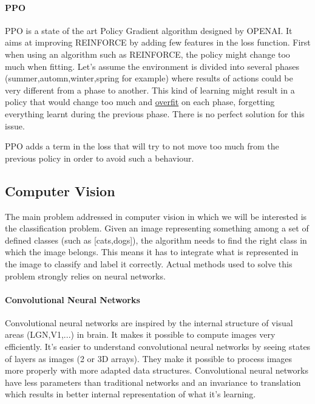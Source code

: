 \documentclass[11pt]{article}
\begin{document}
\paragraph{PPO}
PPO is a state of the art Policy Gradient algorithm designed by OPENAI. It aims at improving REINFORCE by adding few features in the loss function. First when using an algorithm such as REINFORCE, the policy might change too much when fitting. Let's assume the environment is divided into several phases (summer,automn,winter,spring for example) where results of actions could be very different from a phase to another. This kind of learning might result in a policy that would change too much and \underline{overfit} on each phase, forgetting everything learnt during the previous phase. There is no perfect solution for this issue.

PPO adds a term in the loss that will try to not move too much from the previous policy in order to avoid such a behaviour.
\subsection{Computer Vision}
The main problem addressed in computer vision in which we will be interested is the classification problem. Given an image representing something among a set of defined classes (such as [cats,dogs]), the algorithm needs to find the right class in which the image belongs. This means it has to integrate what is represented in the image to classify and label it correctly. Actual methods used to solve this problem strongly relies on neural networks.

\paragraph{Convolutional Neural Networks}
Convolutional neural networks are inspired by the internal structure of visual areas (LGN,V1,...) in brain. It makes it possible to compute images very efficiently. It's easier to understand convolutional neural networks by seeing states of layers as images (2 or 3D arrays). They make it possible to process images more properly with more adapted data structures. Convolutional neural networks have less parameters than traditional networks and an invariance to translation which results in better internal representation of what it's learning.
\end{document}
